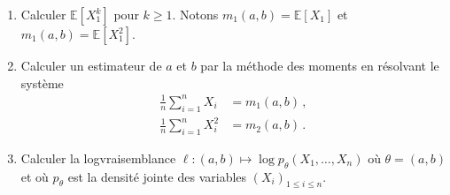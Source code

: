 \documentclass[a4paper,10pt,fleqn]{article}
\newcommand{\1}{\ensuremath{\mathbbm{1}}}
\begin{document}
\begin{enumerate}
\item Calculer $\mathbb{E}[X_1^k]$ pour $k\geq 1$. Notons $m_1(a,b) = \mathbb{E}[X_1]$ et $m_1(a,b) = \mathbb{E}[X^2_1]$.
%
%

 \item Calculer un estimateur de $a$ et $b$ par la m\'ethode des moments en r\'esolvant le syst\`eme
\begin{align*}
\frac{1}{n}\sum_{i=1}^nX_i &= m_1(a,b) \,,\\
\frac{1}{n}\sum_{i=1}^nX^2_i &= m_2(a,b) \,.
\end{align*}

%

\item Calculer la logvraisemblance $\ell : (a,b) \mapsto \log p_\theta (X_1,\ldots,X_n)$ o\`u $\theta = (a,b)$ et o\`u $p_\theta$ est la densit\'e jointe des variables $(X_i)_{1\leq i \leq n}$.

%


\end{enumerate}
\end{document}
